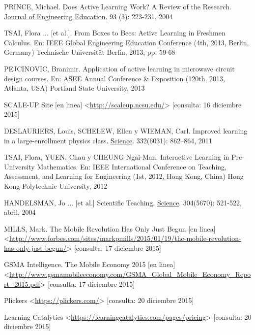 \begin{thebibliography}{9}

    PRINCE, Michael.
    Does Active Learning Work? A Review of the Research.
    \uline{Journal of Engineering Education.}
    93 (3): 223-231, 2004

    TSAI, Flora ... [et al.].
    From Boxes to Bees:
        Active Learning in Freshmen Calculus.
    En: IEEE Global Engineering Education Conference
    (4th, 2013, Berlin, Germany)
    Technische Universität Berlin,
    2013,
    pp. 59-68

    PEJCINOVIC, Branimir.
    Application of active learning in microwave circuit
        design courses.
    En: ASEE Annual Conference \& Exposition
    (120th, 2013, Atlanta, USA)
    Portland State University,
    2013

    SCALE-UP Site [en linea]
    <\url{http://scaleup.ncsu.edu/}>
    [consulta: 16 diciembre 2015]

    DESLAURIERS, Louis, SCHELEW, Ellen y WIEMAN, Carl.
    Improved learning in a large-enrollment physics class.
    \uline{Science}.
    332(6031): 862–864,
    2011

    TSAI, Flora, YUEN, Chau y CHEUNG Ngai-Man.
    Interactive Learning in Pre-University Mathematics.
    En: IEEE International Conference on Teaching,
        Assessment, and Learning for Engineering
    (1st, 2012, Hong Kong, China)
    Hong Kong Polytechnic University,
    2012

    HANDELSMAN, Jo ... [et al.]
    Scientific Teaching.
    \uline{Science}.
    304(5670): 521-522,
    abril, 2004

    MILLS, Mark.
    The Mobile Revolution Has Only Just Begun [en linea] \\
    <\url{http://www.forbes.com/sites/markpmills/2015/01/19/the-mobile-revolution-has-only-just-begun/}>
    [consulta: 17 diciembre 2015]

    GSMA Intelligence.
    The Mobile Economy 2015 [en linea] \\
    <\url{http://www.gsmamobileeconomy.com/GSMA_Global_Mobile_Economy_Report_2015.pdf}>
    [consulta: 17 diciembre 2015]

    Plickers
    <\url{https://plickers.com/}>
    [consulta: 20 diciembre 2015]

    Learning Catalytics
    <\url{https://learningcatalytics.com/pages/pricing}>
    [consulta: 20 diciembre 2015]


\end{thebibliography}
